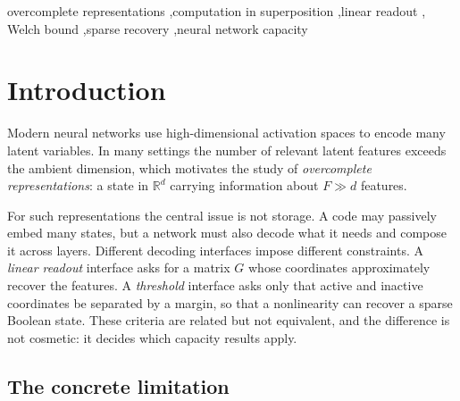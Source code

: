 \documentclass[preprint,12pt]{elsarticle}
\theoremstyle{definition}
\newcommand{\R}{\mathbb{R}}
\begin{document}
\begin{frontmatter}
\begin{abstract}
Two limits are stated rather than implied: frontier statements are worst cases over amplitudes, not
claims about typical use; and the decoder comparison measures what supervised fitting recovers, not
what an affine map can express, since the probe class contains the network's own decoder.
\end{abstract}

\begin{keyword}
overcomplete representations \sep computation in superposition \sep linear readout \sep
Welch bound \sep sparse recovery \sep neural network capacity
\end{keyword}

\end{frontmatter}

\section{Introduction}
\label{sec:intro}

Modern neural networks use high-dimensional activation spaces to encode many latent
variables. In many settings the number of relevant latent features exceeds the ambient
dimension, which motivates the study of \emph{overcomplete representations}: a state in
$\R^d$ carrying information about $F\gg d$ features.

For such representations the central issue is not storage. A code may passively embed many
states, but a network must also decode what it needs and compose it across layers. Different
decoding interfaces impose different constraints. A \emph{linear readout} interface asks for
a matrix $G$ whose coordinates approximately recover the features. A \emph{threshold}
interface asks only that active and inactive coordinates be separated by a margin, so that a
nonlinearity can recover a sparse Boolean state. These criteria are related but not
equivalent, and the difference is not cosmetic: it decides which capacity results apply.

\subsection{The concrete limitation}
\end{document}

